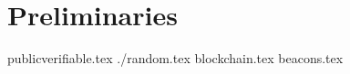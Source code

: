 \section{Preliminaries}\label{sec:preliminaries}


{publicverifiable.tex}
{./random.tex}
{blockchain.tex}
{beacons.tex}
